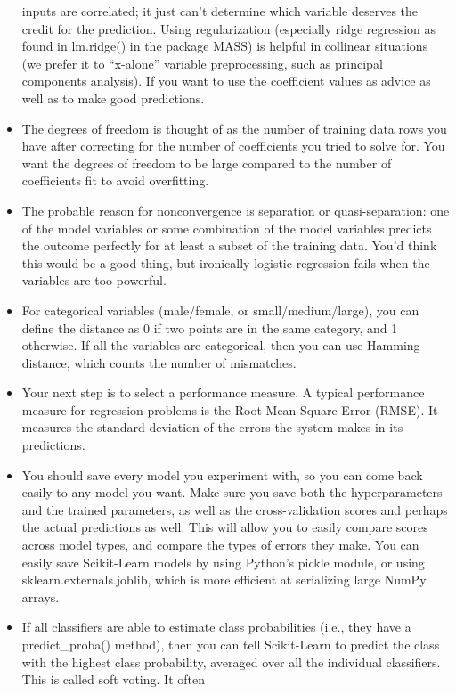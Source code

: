\documentclass[]{book}
\begin{document}
\begin{itemize}
  inputs are correlated; it just can't determine which variable deserves
  the credit for the prediction. Using regularization (especially ridge
  regression as found in lm.ridge() in the package MASS) is helpful in
  collinear situations (we prefer it to ``x-alone'' variable
  preprocessing, such as principal components analysis). If you want to
  use the coefficient values as advice as well as to make good
  predictions.
\item
  The degrees of freedom is thought of as the number of training data
  rows you have after correcting for the number of coefficients you
  tried to solve for. You want the degrees of freedom to be large
  compared to the number of coefficients fit to avoid overfitting.
\item
  The probable reason for nonconvergence is separation or
  quasi-separation: one of the model variables or some combination of
  the model variables predicts the outcome perfectly for at least a
  subset of the training data. You'd think this would be a good thing,
  but ironically logistic regression fails when the variables are too
  powerful.
\item
  For categorical variables (male/female, or small/medium/large), you
  can define the distance as 0 if two points are in the same category,
  and 1 otherwise. If all the variables are categorical, then you can
  use Hamming distance, which counts the number of mismatches.
\item
  Your next step is to select a performance measure. A typical
  performance measure for regression problems is the Root Mean Square
  Error (RMSE). It measures the standard deviation of the errors the
  system makes in its predictions.
\item
  You should save every model you experiment with, so you can come back
  easily to any model you want. Make sure you save both the
  hyperparameters and the trained parameters, as well as the
  cross-validation scores and perhaps the actual predictions as well.
  This will allow you to easily compare scores across model types, and
  compare the types of errors they make. You can easily save
  Scikit-Learn models by using Python's pickle module, or using
  sklearn.externals.joblib, which is more efficient at serializing large
  NumPy arrays.
\item
  If all classifiers are able to estimate class probabilities (i.e.,
  they have a predict\_proba() method), then you can tell Scikit-Learn
  to predict the class with the highest class probability, averaged over
  all the individual classifiers. This is called soft voting. It often

\end{itemize}
\end{document}
